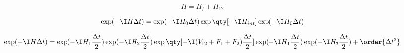
\begin{equation}
H = H_f + H_{12}
\end{equation}

\begin{equation}
\exp(-\I H \Delta t) = \exp(-\I H_0\Delta t) \exp\qty[-\I H_{int}] \exp(-\I H_0 \Delta t)
\end{equation}


\begin{equation}
\exp(-\I H\Delta t) = \exp(-\I H_{1} \frac{\Delta t}{2}) \exp(-\I H_2 \frac{\Delta t}{2}) \exp\qty[-\I (V_{12} + F_1 + F_2) \frac{\Delta t}{2}] \exp(-\I H_{1} \frac{\Delta t}{2}) \exp(-\I H_{2} \frac{\Delta t}{2}) + \order{\Delta t^3}
\end{equation}
